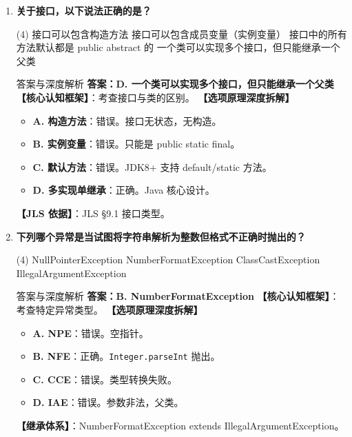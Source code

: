 \documentclass[12pt, a4paper]{ctexart}
\newcommand{\code}[1]{\texttt{#1}}
\begin{document}
\begin{enumerate}[label=\textbf{\arabic*.}, itemsep=1em]
    \item \textbf{关于接口，以下说法正确的是？}
    \begin{tasks}(4)
        \task 接口可以包含构造方法 \task 接口可以包含成员变量（实例变量）
        \task 接口中的所有方法默认都是 public abstract 的 \task 一个类可以实现多个接口，但只能继承一个父类
    \end{tasks}
    \begin{bluebox}{答案与深度解析}
    \textbf{答案：D. 一个类可以实现多个接口，但只能继承一个父类}
    \textbf{【核心认知框架】}：考查接口与类的区别。
    \textbf{【选项原理深度拆解】}
    \begin{itemize}[leftmargin=*, nosep]
        \item \textbf{A. 构造方法}：错误。接口无状态，无构造。
        \item \textbf{B. 实例变量}：错误。只能是 public static final。
        \item \textbf{C. 默认方法}：错误。JDK8+ 支持 default/static 方法。
        \item \textbf{D. 多实现单继承}：正确。Java 核心设计。
    \end{itemize}
    \textbf{【JLS 依据】}：JLS §9.1 接口类型。
    \end{bluebox}

    \item \textbf{下列哪个异常是当试图将字符串解析为整数但格式不正确时抛出的？}
    \begin{tasks}(4)
        \task NullPointerException \task NumberFormatException
        \task ClassCastException \task IllegalArgumentException
    \end{tasks}
    \begin{bluebox}{答案与深度解析}
    \textbf{答案：B. NumberFormatException}
    \textbf{【核心认知框架】}：考查特定异常类型。
    \textbf{【选项原理深度拆解】}
    \begin{itemize}[leftmargin=*, nosep]
        \item \textbf{A. NPE}：错误。空指针。
        \item \textbf{B. NFE}：正确。\code{Integer.parseInt} 抛出。
        \item \textbf{C. CCE}：错误。类型转换失败。
        \item \textbf{D. IAE}：错误。参数非法，父类。
    \end{itemize}
    \textbf{【继承体系】}：NumberFormatException  extends IllegalArgumentException。
    \end{bluebox}


\end{enumerate}
\end{document}

